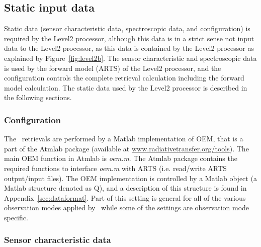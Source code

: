 \subsection{Static input data}
\label{sec:static}
Static data (sensor characteristic data, spectroscopic data, and configuration)
is required by the Level2 processor, although this data is in a strict
sense not input data to the Level2 processor, as this data
is contained by the Level2 processor as explained by Figure~\ref{fig:level2b}.
The sensor characteristic and spectroscopic data
is used by the forward model (ARTS) of the Level2 processor,
and the configuration controls the complete retrieval
calculation including the forward model calculation.  
The static data used by the Level2 processor is 
described in the following sections.
 

\subsubsection{Configuration}

The \smr\ retrievals are performed by a Matlab implementation of OEM,
that is a part of the Atmlab package (available at \url{www.radiativetransfer.org/tools}).
The main OEM function in Atmlab is \emph{oem.m}. 
The Atmlab package contains the required functions to interface \emph{oem.m} with ARTS
(i.e. read/write ARTS output/input files).
The OEM implementation is controlled by a Matlab object
(a Matlab structure denoted as Q), and  
a description of this structure is found in Appendix~\ref{sec:dataformat}.
Part of this setting is general for all of the various 
observation modes applied by \smr\, while some of the settings
are observation mode specific.

\subsubsection{Sensor characteristic data}

